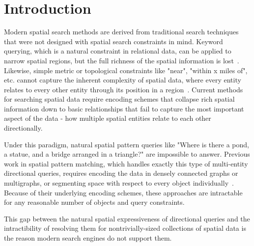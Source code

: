 \section{Introduction}

\label{section:introduction}

Modern spatial search methods are derived from traditional search techniques that were not designed with spatial search constraints in mind.
Keyword querying, which is a natural constraint in relational data, can be applied to narrow spatial regions, but the full richness of the spatial information is lost~\cite{Guo2015, Cao2012, Zhang2009, Osul2023}.
Likewise, simple metric or topological constraints like "near", "within x miles of", etc. cannot capture the inherent complexity of spatial data, where every entity relates to every other entity through its position in a region~\cite{Carniel2020,Bertella2022,Carniel2023}. 
Current methods for searching spatial data require encoding schemes that collapse rich spatial information down to basic relationships that fail to capture the most important aspect of the data - how multiple spatial entities relate to each other directionally.

Under this paradigm, natural spatial pattern queries like "Where is there a pond, a statue, and a bridge arranged in a triangle?" are impossible to answer.
Previous work in spatial pattern matching, which handles exactly this type of multi-entity directional queries, requires encoding the data in densely connected graphs or multigraphs, or segmenting space with respect to every object individually~\cite{Folkers2000, Fang2019,Chen2019,Fang2019}.
Because of their underlying encoding schemes, these approaches are intractable for any reasonable number of objects and query constraints.
 
This gap between the natural spatial expressiveness of directional queries and the intractibility of resolving them for nontrivially-sized collections of spatial data is the reason modern search engines do not support them.

